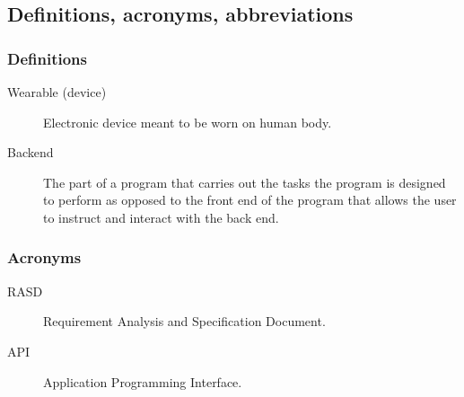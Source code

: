 \documentclass[../main.tex]{subfiles}
\begin{document}
%
%
%
%
%

\subsection{Definitions, acronyms, abbreviations}

\subsubsection{Definitions}
\begin{description}

	\item [Wearable (device)] Electronic device meant to be worn on human body.
	\item [Backend] The part of a program that carries out the tasks the program is designed to perform as opposed to the front end of the program that allows the user to instruct and interact with the back end.

\end{description}


\subsubsection{Acronyms}
\begin{description}

	\item [RASD] Requirement Analysis and Specification Document.
	\item [API] Application Programming Interface.

\end{description}
\end{document}
